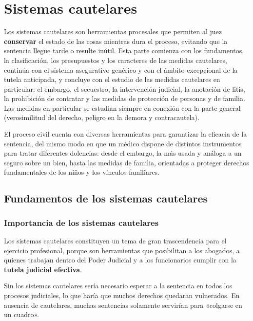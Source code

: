 \documentclass[12pt,oneside]{book}
\begin{document}
\part{Sistemas cautelares}\label{pt:cautelares}
Los sistemas cautelares son herramientas procesales que permiten al juez \textbf{conservar} el estado de las cosas mientras dura el proceso, evitando que la sentencia llegue tarde o resulte inútil. Esta parte comienza con los fundamentos, la clasificación, los presupuestos y los caracteres de las medidas cautelares, continúa con el sistema asegurativo genérico y con el ámbito excepcional de la tutela anticipada, y concluye con el estudio de las medidas cautelares en particular: el embargo, el secuestro, la intervención judicial, la anotación de litis, la prohibición de contratar y las medidas de protección de personas y de familia. Las medidas en particular se estudian siempre en conexión con la parte general (verosimilitud del derecho, peligro en la demora y contracautela).

El proceso civil cuenta con diversas herramientas para garantizar la eficacia de la sentencia, del mismo modo en que un médico dispone de distintos instrumentos para tratar diferentes dolencias: desde el embargo, la más usada y análoga a un seguro sobre un bien, hasta las medidas de familia, orientadas a proteger derechos fundamentales de los niños y los vínculos familiares.

\chapter[Fundamentos de los sistemas cautelares]{Fundamentos de los sistemas cautelares}\label{cap:fundamentos-cautelares}


\section{Importancia de los sistemas cautelares}

Los sistemas cautelares constituyen un tema de gran trascendencia para el ejercicio profesional, porque son herramientas que posibilitan a los abogados, a quienes trabajan dentro del Poder Judicial y a los funcionarios cumplir con la \textbf{tutela judicial efectiva}.

Sin los sistemas cautelares sería necesario esperar a la sentencia en todos los procesos judiciales, lo que haría que muchos derechos quedaran vulnerados. En ausencia de cautelares, muchas sentencias solamente servirían para «colgarse en un cuadro».
\end{document}
